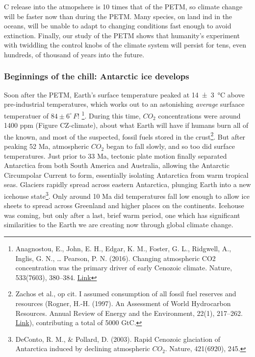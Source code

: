 \documentclass[amstex,12pt]{book}
\begin{document}
C release into the atmopshere is 10 times that of the PETM, so climate change will be faster now than during the PETM. Many species, on land ind in the oceans, will be unable to adapt to changing conditions fast enough to avoid extinction. Finally, our study of the PETM shows that humanity's experiment with twiddling the control knobs of the climate system will persist for tens, even hundreds, of thousand of years into the future.  

\subsubsection{Beginnings of the chill: Antarctic ice develops}
Soon after the PETM, Earth's surface temperature peaked at \SI{14(3)}{\celsius} above pre-industrial temperatures, which works out to an astonishing \emph{average} surfaace temperatuer of $84\pm 6 ^\circ\,F$! \footnote{Anagnostou, E., John, E. H., Edgar, K. M., Foster, G. L., Ridgwell, A., Inglis, G. N., … Pearson, P. N. (2016). Changing atmospheric CO2 concentration was the primary driver of early Cenozoic climate. Nature, 533(7603), 380–384. \href{https://doi.org/10.1038/nature17423}{Link}}. During this time, $CO_2$ concentrations were around 1400 ppm (Figure CZ-climate), about what Earth will have if humans burn all of the known, and most of the suspected, fossil fuels stored in the crust\footnote{Zachos et al., op cit. I assumed consumption of all fossil fuel reserves and resources (Rogner, H.-H. (1997). An Assessment of World Hydrocarbon Resources. Annual Review of Energy and the Environment, 22(1), 217–262. \href{https://doi.org/10.1146/annurev.energy.22.1.217}{Link}), contributing a total of 5000 GtC.}. But after peaking 52 Ma, atmospheric $CO_2$ began to fall slowly, and so too did surface temperatures. Just prior to 33 Ma, tectonic plate motion finally separated Antarctica from both South America and Australia, allowing the Antarctic Circumpolar Current to form, essentially isolating Antarctica from warm tropical seas. Glaciers rapidly spread across eastern Antarctica, plunging Earth into a new icehouse state\footnote{DeConto, R. M., \& Pollard, D. (2003). Rapid Cenozoic glaciation of Antarctica induced by declining atmospheric $CO_2$. Nature, 421(6920), 245.}. Only around 10 Ma did temperatures fall low enough to allow ice sheets to spread across Greenland and higher places on the continents. Icehouse was coming, but only after a last, brief warm period, one which has significant similarities to the Earth we are creating now through global climate change.\\ 
\end{document}

